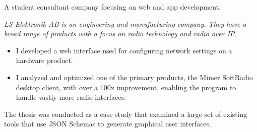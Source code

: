 \documentclass[10pt,a4paper]{altacv}
\begin{document}

\begin{fullwidth}
\makecvheader
\end{fullwidth}




A student consultant company focusing on web and app development.

\divider

\textit{LS Elektronik AB is an engineering and manufacturing company. They have a broad range of products with a focus on radio technology and radio over IP.}
\begin{itemize}
    \item I developed a web interface used for configuring network settings on a hardware product.
    \item I analyzed and optimized one of the primary products, the Mimer SoftRadio desktop client, with over a 100x improvement, enabling the program to handle vastly more radio interfaces.
\end{itemize}

\divider

The thesis was conducted as a case study that examined a large set of existing tools that use JSON Schemas to generate graphical user interfaces.
\end{document}
